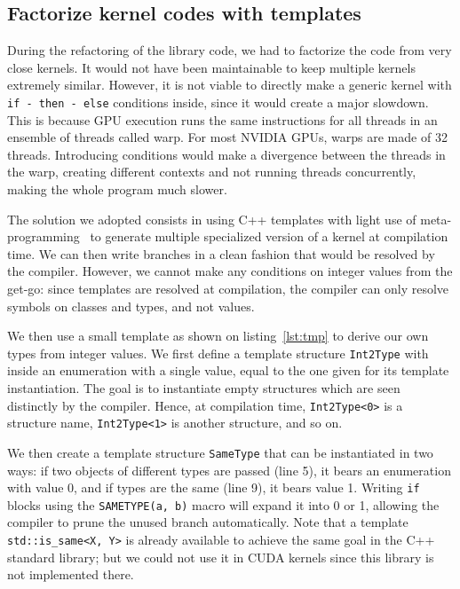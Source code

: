 
\subsection{Factorize kernel codes with templates}

During the refactoring of the library code, we had to factorize the code from very close kernels. It would not have been maintainable to keep multiple kernels extremely similar. However, it is not viable to directly make a generic kernel with \verb|if - then - else| conditions inside, since it would create a major slowdown. This is because GPU execution runs the same instructions for all threads in an ensemble of threads called warp. For most NVIDIA GPUs, warps are made of 32 threads. Introducing conditions would make a divergence between the threads in the warp, creating different contexts and not running threads concurrently, making the whole program much slower.

The solution we adopted consists in using C++ templates with light use of meta-programming~\cite{wikibook:tmp} to generate multiple specialized version of a kernel at compilation time. We can then write branches in a clean fashion that would be resolved by the compiler. However, we cannot make any conditions on integer values from the get-go: since templates are resolved at compilation, the compiler can only resolve symbols on classes and types, and not values. 

We then use a small template as shown on listing~\ref{lst:tmp} to derive our own types from integer values. We first define a template structure \verb|Int2Type| with inside an enumeration with a single value, equal to the one given for its template instantiation. The goal is to instantiate empty structures which are seen distinctly by the compiler. Hence, at compilation time, \verb|Int2Type<0>| is a structure name, \verb|Int2Type<1>| is another structure, and so on.

We then create a template structure \verb|SameType| that can be instantiated in two ways: if two objects of different types are passed (line 5), it bears an enumeration with value 0, and if types are the same (line 9), it bears value 1. Writing \verb|if| blocks using the \verb|SAMETYPE(a, b)| macro will expand it into 0 or 1, allowing the compiler to prune the unused branch automatically. Note that a template \verb|std::is_same<X, Y>| is already available to achieve the same goal in the C++ standard library; but we could not use it in CUDA kernels since this library is not implemented there.

